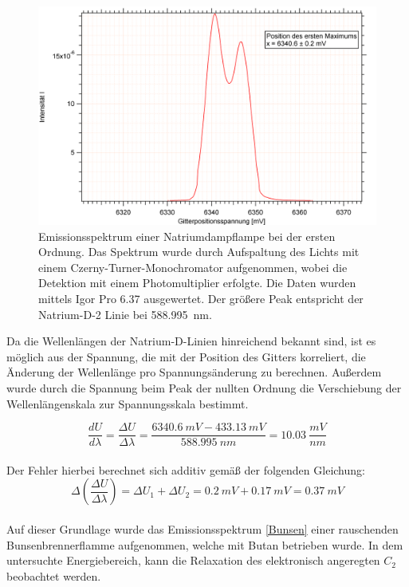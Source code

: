\begin{figure}[H]
	\centering	
	\begin{minipage}{1\textwidth}
	\includegraphics[width=\columnwidth]{Bilder/Graph2.png}
	\end{minipage}
	
	
	\caption{Emissionsspektrum einer Natriumdampflampe bei der ersten Ordnung. Das Spektrum wurde durch Aufspaltung des Lichts mit einem Czerny-Turner-Monochromator aufgenommen, wobei die Detektion mit einem Photomultiplier erfolgte. Die Daten wurden mittels Igor Pro 6.37 ausgewertet. Der größere Peak entspricht der Natrium-D-2 Linie bei 588.995~\si{nm}.}
	
	
	\label{Eins}
\end{figure}



Da die Wellenlängen der Natrium-D-Linien hinreichend bekannt sind, ist es möglich aus der Spannung, die mit der Position des Gitters korreliert, die Änderung der Wellenlänge pro Spannungsänderung zu berechnen.\cite{lit} Außerdem wurde durch die Spannung beim Peak der nullten Ordnung die Verschiebung der Wellenlängenskala zur Spannungsskala bestimmt.

\begin {equation}
\frac{dU}{d\lambda}=\frac{\Delta U}{\Delta\lambda}=\frac{6340.6~\si{mV} - 433.13~\si{mV}}{588.995~\si{nm}}=10.03~\si{\frac{mV}{nm}} 
\end {equation}
\\
Der Fehler hierbei berechnet sich additiv gemäß der folgenden Gleichung:
\\
\begin {equation}
\Delta\left(\frac{\Delta U}{\Delta \lambda}\right) = \Delta U_1 + \Delta U_2 = 0.2~\si{mV}+0.17~\si{mV}=0.37~\si{mV}
\end{equation}
\\
Auf dieser Grundlage wurde das Emissionsspektrum \ref{Bunsen} einer rauschenden Bunsenbrennerflamme aufgenommen, welche mit Butan betrieben wurde. In dem untersuchte Energiebereich, kann die Relaxation des elektronisch angeregten $C_2$ beobachtet werden.



